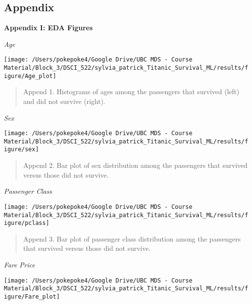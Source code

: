 \documentclass[]{article}
\begin{document}
\newpage

\subsection{Appendix}\label{appendix}

\textbf{Appendix I: EDA Figures}

\emph{Age}

\begin{center}\texttt{[image: /Users/pokepoke4/Google Drive/UBC MDS - Course Material/Block\_3/DSCI\_522/sylvia\_patrick\_Titanic\_Survival\_ML/results/figure/Age\_plot]} \end{center}

\begin{quote}
Append 1. Histograms of ages among the passengers that survived (left)
and did not survive (right).
\end{quote}

\newpage

\emph{Sex}

\begin{center}\texttt{[image: /Users/pokepoke4/Google Drive/UBC MDS - Course Material/Block\_3/DSCI\_522/sylvia\_patrick\_Titanic\_Survival\_ML/results/figure/sex]} \end{center}

\begin{quote}
Append 2. Bar plot of sex distribution among the passengers that
survived versus those did not survive.
\end{quote}

\newpage

\emph{Passenger Class}

\begin{center}\texttt{[image: /Users/pokepoke4/Google Drive/UBC MDS - Course Material/Block\_3/DSCI\_522/sylvia\_patrick\_Titanic\_Survival\_ML/results/figure/pclass]} \end{center}

\begin{quote}
Append 3. Bar plot of passenger class distribution among the passengers
that survived versus those did not survive.
\end{quote}

\newpage

\emph{Fare Price}

\begin{center}\texttt{[image: /Users/pokepoke4/Google Drive/UBC MDS - Course Material/Block\_3/DSCI\_522/sylvia\_patrick\_Titanic\_Survival\_ML/results/figure/Fare\_plot]} \end{center}
\end{document}
